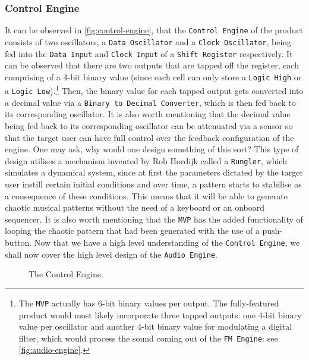 \documentclass[12pt]{article}
\begin{document}
\subsubsection{Control Engine}
It can be observed in \autoref{fig:control-engine}, that the \texttt{Control Engine} of the product consists of two oscillators, a \texttt{Data Oscillator} and a \texttt{Clock Oscillator}, being fed into the \texttt{Data Input} and \texttt{Clock Input} of a \texttt{Shift Register} respectively. It can be observed that there are two outputs that are tapped off the register, each comprising of a 4-bit binary value (since each cell can only store a \texttt{Logic High} or a \texttt{Logic Low}).\footnote{The \texttt{MVP} actually has 6-bit binary values per output. The fully-featured product would most likely incorporate three tapped outputs: one 4-bit binary value per oscillator and another 4-bit binary value for modulating a digital filter, which would process the sound coming out of the \texttt{FM Engine}: see \autoref{fig:audio-engine}.} Then, the binary value for each tapped output gets converted into a decimal value via a \texttt{Binary to Decimal Converter}, which is then fed back to its corresponding oscillator. It is also worth mentioning that the decimal value being fed back to its corresponding oscillator can be attenuated via a sensor so that the target user can have full control over the feedback configuration of the engine. One may ask, why would one design something of this sort? This type of design utilises a mechanism invented by Rob Hordijk called a \texttt{Rungler}, which simulates a dynamical system, since at first the parameters dictated by the target user instill certain initial conditions and over time, a pattern starts to stabilise as a consequence of these conditions\cite{Rungler}. This means that it will be able to generate chaotic musical patterns without the need of a keyboard or an onboard sequencer. It is also worth mentioning that the \texttt{MVP} has the added functionality of looping the chaotic pattern that had been generated with the use of a push-button. Now that we have a high level understanding of the \texttt{Control Engine}, we shall now cover the high level design of the \texttt{Audio Engine}.
\begin{figure}[ht]
    \centering
    \caption{The Control Engine.}%
    \label{fig:control-engine}
\end{figure}
\end{document}
